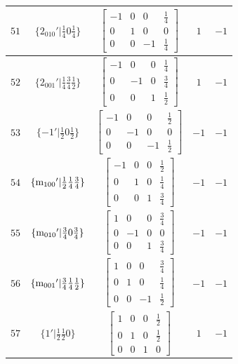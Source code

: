 \documentclass[fleqn,8pt]{jsarticle}
\begin{document}
\begin{longtable}{ccccc}
$ 51 $ & $ \{2{}_{010}{}'|\frac{1}{4} 0 \frac{1}{4}\} $ & $ \begin{bmatrix} -1 & 0 & 0 & \frac{1}{4} \\ 0 & 1 & 0 & 0 \\ 0 & 0 & -1 & \frac{1}{4} \end{bmatrix} $ & $ 1 $ & $ -1 $ \\ \hline
$ 52 $ & $ \{2{}_{001}{}'|\frac{1}{4} \frac{3}{4} \frac{1}{2}\} $ & $ \begin{bmatrix} -1 & 0 & 0 & \frac{1}{4} \\ 0 & -1 & 0 & \frac{3}{4} \\ 0 & 0 & 1 & \frac{1}{2} \end{bmatrix} $ & $ 1 $ & $ -1 $ \\ \hline
$ 53 $ & $ \{-1{}'|\frac{1}{2} 0 \frac{1}{2}\} $ & $ \begin{bmatrix} -1 & 0 & 0 & \frac{1}{2} \\ 0 & -1 & 0 & 0 \\ 0 & 0 & -1 & \frac{1}{2} \end{bmatrix} $ & $ -1 $ & $ -1 $ \\ \hline
$ 54 $ & $ \{{\rm m}_{100}{}'|\frac{1}{2} \frac{1}{4} \frac{3}{4}\} $ & $ \begin{bmatrix} -1 & 0 & 0 & \frac{1}{2} \\ 0 & 1 & 0 & \frac{1}{4} \\ 0 & 0 & 1 & \frac{3}{4} \end{bmatrix} $ & $ -1 $ & $ -1 $ \\ \hline
$ 55 $ & $ \{{\rm m}_{010}{}'|\frac{3}{4} 0 \frac{3}{4}\} $ & $ \begin{bmatrix} 1 & 0 & 0 & \frac{3}{4} \\ 0 & -1 & 0 & 0 \\ 0 & 0 & 1 & \frac{3}{4} \end{bmatrix} $ & $ -1 $ & $ -1 $ \\ \hline
$ 56 $ & $ \{{\rm m}_{001}{}'|\frac{3}{4} \frac{1}{4} \frac{1}{2}\} $ & $ \begin{bmatrix} 1 & 0 & 0 & \frac{3}{4} \\ 0 & 1 & 0 & \frac{1}{4} \\ 0 & 0 & -1 & \frac{1}{2} \end{bmatrix} $ & $ -1 $ & $ -1 $ \\ \hline
$ 57 $ & $ \{1{}'|\frac{1}{2} \frac{1}{2} 0\} $ & $ \begin{bmatrix} 1 & 0 & 0 & \frac{1}{2} \\ 0 & 1 & 0 & \frac{1}{2} \\ 0 & 0 & 1 & 0 \end{bmatrix} $ & $ 1 $ & $ -1 $ \\ \hline

\end{longtable}
\end{document}
